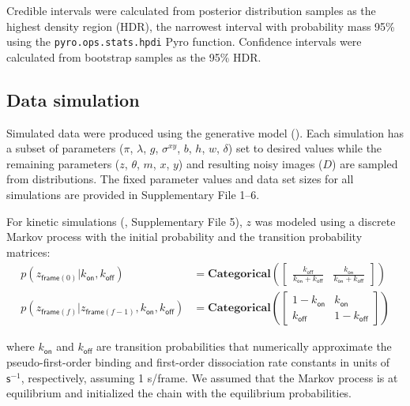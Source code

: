 Credible intervals were calculated from posterior distribution samples as the highest density region (HDR), the narrowest interval with probability mass 95\% using the \texttt{pyro.ops.stats.hpdi} Pyro function. Confidence intervals were calculated from bootstrap samples as the 95\% HDR.

\subsection{Data simulation}

Simulated data were produced using the generative model (). Each simulation has a subset of parameters ($\pi$, $\lambda$, $g$, $\sigma^{xy}$, $b$, $h$, $w$, $\delta$) set to desired values while  the remaining parameters ($z$, $\theta$, $m$, $x$, $y$) and resulting noisy images ($D$) are sampled from distributions. The fixed parameter values and data set sizes for all simulations are provided in Supplementary File 1--6.

For kinetic simulations (, Supplementary File 5), $z$ was modeled using a discrete Markov process with the initial probability and the transition probability matrices:
\begin{subequations}
\begin{align}
    p(z_{\mathsf{frame}(0)} | k_\mathsf{on}, k_\mathsf{off}) &= \mathbf{Categorical} \left( \begin{bmatrix} \frac{k_\mathsf{off}}{k_\mathsf{on} + k_\mathsf{off}} & \frac{k_\mathsf{on}}{k_\mathsf{on} + k_\mathsf{off}} \end{bmatrix} \right) \\
    p(z_{\mathsf{frame}(f)} | z_{\mathsf{frame}(f-1)}, k_\mathsf{on}, k_\mathsf{off}) &= \mathbf{Categorical} \left( \begin{bmatrix} 1 - k_\mathsf{on} & k_\mathsf{on} \\ k_\mathsf{off} & 1 - k_\mathsf{off} \end{bmatrix} \right)
\end{align}
\end{subequations}

\noindent
where $k_{\mathsf{on}}$ and $k_{\mathsf{off}}$ are transition probabilities that numerically approximate the pseudo-first-order binding and first-order dissociation rate constants in units of $\mathsf{s}^{-1}$, respectively, assuming 1 s/frame. We assumed that the Markov process is at equilibrium and initialized the chain with the equilibrium probabilities.

